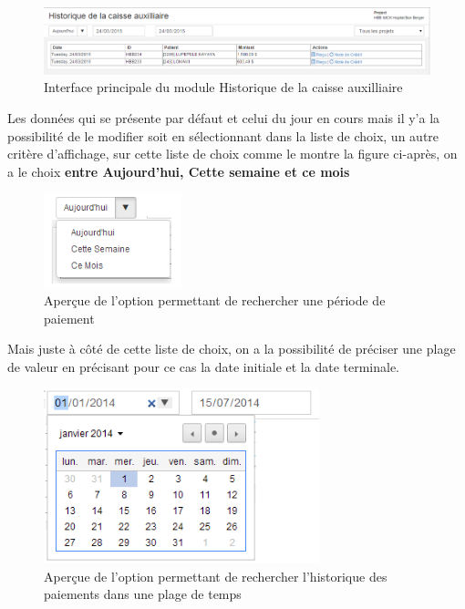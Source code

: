 \documentclass[12pt,a4paper]{report}
\begin{document}
\newpage
\begin{figure}[h]
\begin{center}
\includegraphics[width=14cm]{pic/HistCaAux.png}
\end{center}
\caption{Interface principale du module Historique de la caisse auxilliaire}
\label{Interface principale du module Historique de la caisse auxilliaire}
\end{figure}

Les données qui se présente par défaut et celui du jour en cours mais il y'a la possibilité de le modifier soit en sélectionnant dans la liste de choix, un autre critère d'affichage, sur cette liste de choix comme le montre la figure ci-après, on a le choix \textbf{entre Aujourd'hui, Cette semaine et ce mois} 


\begin{figure}[h]
\begin{center}
\includegraphics[width=4cm]{pic/SelectJour.png}
\end{center}
\caption{Aperçue de l'option permettant de rechercher une période de paiement}
\label{Aperçue de l'option permettant de rechercher une période de paiement}
\end{figure}

Mais juste à côté de cette liste de choix, on a la possibilité de préciser une plage de valeur en précisant pour ce cas la date initiale et la date terminale.

\begin{figure}[h]
\begin{center}
\includegraphics[width=8cm]{pic/SelectPlageValeur.png}
\end{center}
\caption{Aperçue de l'option permettant de rechercher l'historique des paiements dans une plage de temps}
\label{Aperçue de l'option permettant de rechercher l'historique des paiement dans une plage de temps}
\end{figure}
\end{document}
